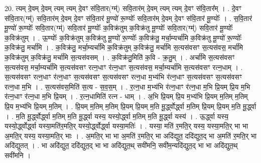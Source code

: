 \documentclass[17pt]{extarticle}
\begin{document}
20. त्यम् दे॒वम् दे॒वम् त्यम् त्यम् दे॒वꣳ स॑वि॒तार(ग्म्॑) सवि॒तार॑म् दे॒वम् त्यम् त्यम् दे॒वꣳ स॑वि॒तार᳚म् । . दे॒वꣳ स॑वि॒तार(ग्म्॑) सवि॒तार॑म् दे॒वम् दे॒वꣳ स॑वि॒तार॑ मू॒ण्यो॑ रू॒ण्योः᳚ सवि॒तार॑म् दे॒वम् दे॒वꣳ स॑वि॒तार॑ मू॒ण्योः᳚ । . स॒वि॒तार॑ मू॒ण्यो॑ रू॒ण्योः᳚ सवि॒तार(ग्म्॑) सवि॒तार॑ मू॒ण्योः᳚ क॒विक्र॑तुम् क॒विक्र॑तु मू॒ण्योः᳚ सवि॒तार(ग्म्॑) सवि॒तार॑ मू॒ण्योः᳚ क॒विक्र॑तुम् । . ऊ॒ण्योः᳚ क॒विक्र॑तुम् क॒विक्र॑तु मू॒ण्यो॑ रू॒ण्योः᳚ क॒विक्र॑तु॒ मर्चा॒म्यर्चा॑मि क॒विक्र॑तु मू॒ण्यो॑ रू॒ण्योः᳚ क॒विक्र॑तु॒ मर्चा॑मि । . क॒विक्र॑तु॒ मर्चा॒म्यर्चा॑मि क॒विक्र॑तुम् क॒विक्र॑तु॒ मर्चा॑मि स॒त्यस॑वसꣳ स॒त्यस॑वस॒ मर्चा॑मि क॒विक्र॑तुम् क॒विक्र॑तु॒ मर्चा॑मि स॒त्यस॑वसम् । . क॒विक्र॑तु॒मिति॑ क॒वि - क्र॒तु॒म् । . अर्चा॑मि स॒त्यस॑वसꣳ स॒त्यस॑वस॒ मर्चा॒म्यर्चा॑मि स॒त्यस॑वसꣳ रत्न॒धाꣳ र॑त्न॒धाꣳ स॒त्यस॑वस॒ मर्चा॒म्यर्चा॑मि स॒त्यस॑वसꣳ रत्न॒धाम् । . स॒त्यस॑वसꣳ रत्न॒धाꣳ र॑त्न॒धाꣳ स॒त्यस॑वसꣳ स॒त्यस॑वसꣳ रत्न॒धा म॒भ्य॑भि र॑त्न॒धाꣳ स॒त्यस॑वसꣳ स॒त्यस॑वसꣳ रत्न॒धा म॒भि । . स॒त्यस॑वस॒मिति॑ स॒त्य - स॒व॒स॒म् । . र॒त्न॒धा म॒भ्य॑भि र॑त्न॒धाꣳ र॑त्न॒धा म॒भि प्रि॒यम् प्रि॒य म॒भि र॑त्न॒धाꣳ र॑त्न॒धा म॒भि प्रि॒यम् । . र॒त्न॒धामिति॑ रत्न - धाम् । . अ॒भि प्रि॒यम् प्रि॒य म॒भ्य॑भि प्रि॒यम् म॒तिम् म॒तिम् प्रि॒य म॒भ्य॑भि प्रि॒यम् म॒तिम् । . प्रि॒यम् म॒तिम् म॒तिम् प्रि॒यम् प्रि॒यम् म॒ति मू॒र्द्ध्वोर्द्ध्वा म॒तिम् प्रि॒यम् प्रि॒यम् म॒ति मू॒र्द्ध्वा । . म॒ति मू॒र्द्ध्वोर्द्ध्वा म॒तिम् म॒ति मू॒र्द्ध्वा यस्य॒ यस्यो॒र्द्ध्वा म॒तिम् म॒ति मू॒र्द्ध्वा यस्य॑ । . ऊ॒र्द्ध्वा यस्य॒ यस्यो॒र्द्ध्वोर्द्ध्वा यस्या॒मति॑र॒मति॒र् यस्यो॒र्द्ध्वोर्द्ध्वा यस्या॒मतिः॑ । . यस्या॒ मति॑ र॒मति॒र् यस्य॒ यस्या॒मति॒र् भा भा अ॒मति॒र् यस्य॒ यस्या॒मति॒र् भाः । . अ॒मति॒र् भा भा अ॒मति॑ र॒मति॒र् भा अदि॑द्युत॒ ददि॑द्युत॒द् भा अ॒मति॑ र॒मति॒र् भा अदि॑द्युतत् । . भा अदि॑द्युत॒ ददि॑द्युत॒द् भा भा अदि॑द्युत॒थ् सवी॑मनि॒ सवी॑म॒न्यदि॑द्युत॒द् भा भा अदि॑द्युत॒थ् सवी॑मनि । \newline
\end{document}
